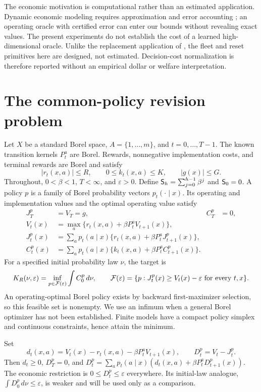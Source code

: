 The economic motivation is computational rather than an estimated application. Dynamic economic modeling requires approximation and error accounting \citep{Judd1998,BrummScheidegger2017}; an operating oracle with certified error can enter our bounds without revealing exact values. The present experiments do not establish the cost of a learned high-dimensional oracle. Unlike the replacement application of \citet{Rust1987}, the fleet and reset primitives here are designed, not estimated. Decision-cost normalization is therefore reported without an empirical dollar or welfare interpretation.

\section{The common-policy revision problem}\label{sec:model48}
Let $X$ be a standard Borel space, $A=\{1,\ldots,m\}$, and $t=0,\ldots,T-1$. The known transition kernels $P_t^a$ are Borel. Rewards, nonnegative implementation costs, and terminal rewards are Borel and satisfy
\[
 |r_t(x,a)|\le R,\qquad 0\le k_t(x,a)\le K,\qquad |g(x)|\le G.
\]
Throughout, $0<\beta<1$, $T<\infty$, and $\varepsilon>0$. Define $\mathsf S_{h}=\sum_{j=0}^{h-1}\beta^j$ and $\mathsf S_{0}=0$. A policy $p$ is a family of Borel probability vectors $p_t(\cdot\mid x)$. Its operating and implementation values and the optimal operating value satisfy
\begin{align}
 J_T^p&=V_T=g,& C_T^p&=0,\nonumber\\
 V_t(x)&=\max_a\{r_t(x,a)+\beta P_t^aV_{t+1}(x)\},\label{eq:value48}\\
 J_t^p(x)&=\sum_a p_t(a\mid x)\{r_t(x,a)+\beta P_t^aJ_{t+1}^p(x)\},\label{eq:policy48}\\
 C_t^p(x)&=\sum_a p_t(a\mid x)\{k_t(x,a)+\beta P_t^aC_{t+1}^p(x)\}.\nonumber
\end{align}
For a specified initial probability law $\nu$, the target is
\begin{equation}\label{eq:target48}
 K_R(\nu,\varepsilon)=\inf_{p\in\mathcal F(\varepsilon)}\int C_0^p\,d\nu,
 \qquad \mathcal F(\varepsilon)=\{p:J_t^p(x)\ge V_t(x)-\varepsilon\text{ for every }t,x\}.
\end{equation}
An operating-optimal Borel policy exists by backward first-maximizer selection, so this feasible set is nonempty. We use an infimum when a general Borel optimizer has not been established. Finite models have a compact policy simplex and continuous constraints, hence attain the minimum.

Set
\begin{equation}\label{eq:regret48}
 d_t(x,a)=V_t(x)-r_t(x,a)-\beta P_t^aV_{t+1}(x),\qquad D_t^p=V_t-J_t^p.
\end{equation}
Then $d_t\ge0$, $D_T^p=0$, and $D_t^p=\sum_a p_t(a\mid x)(d_t(x,a)+\beta P_t^aD_{t+1}^p(x))$. The economic restriction is $0\le D_t^p\le\varepsilon$ everywhere. Its initial-law analogue, $\int D_0^p\,d\nu\le\varepsilon$, is weaker and will be used only as a comparison.

